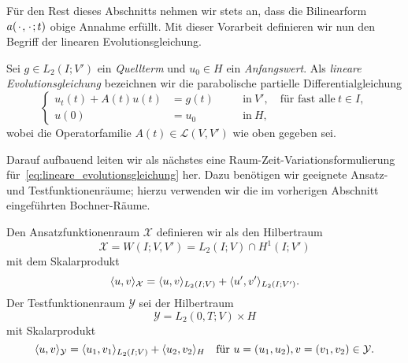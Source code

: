 Für den Rest dieses Abschnitts nehmen wir stets an, dass die Bilinearform $a({\mkern2mu\cdot\mkern2mu}, {\mkern2mu\cdot\mkern2mu}; t)$ obige Annahme erfüllt.
Mit dieser Vorarbeit definieren wir nun den Begriff der linearen Evolutionsgleichung.

\begin{Definition}
\label{definition:lineare_evolutionsgleichung}
    Sei $g \in L_{2}(I; V')$ ein \emph{Quellterm} und $u_{0} \in H$ ein \emph{Anfangswert}.
    Als \emph{lineare Evolutionsgleichung} bezeichnen wir die parabolische partielle Differentialgleichung
    \begin{equation}
        \label{eq:lineare_evolutionsgleichung}
        \left\{
        \begin{aligned}
            u_{t}(t) + A(t) u(t) &= g(t)     \quad&&\text{in}~V', \quad \text{für fast alle}~t \in I, \\
            u(0) &= u_{0}                    \quad&&\text{in}~H,
        \end{aligned}
        \right.
    \end{equation}
    wobei die  Operatorfamilie $A(t) \in \mathcal L(V, V')$ wie oben gegeben sei.
\end{Definition}

Darauf aufbauend leiten wir als nächstes eine Raum-Zeit-Variationsformulierung für~\cref{eq:lineare_evolutionsgleichung} her.
Dazu benötigen wir geeignete Ansatz- und Testfunktionenräume; hierzu verwenden wir die im vorherigen Abschnitt eingeführten Bochner-Räume.

\begin{Definition}
\label{definition:ansatz_und_testraum}
    Den Ansatzfunktionenraum $\mathcal X$ definieren wir als den Hilbertraum
    \begin{equation}
    \label{eq:ansatzraum_X}
        \mathcal X = W(I; V, V') = L_{2}(I; V) \cap H^{1}(I; V')
    \end{equation}
    mit dem Skalarprodukt
    \begin{equation}
    \label{eq:ansatzraum_skalarprodukt}
        \langle u,v\rangle_{\mathcal X} = \langle u,v\rangle_{L_{2}(I; V)} + \langle u',v'\rangle_{L_{2}(I; V')}.
    \end{equation}
    Der Testfunktionenraum $\mathcal Y$ sei der Hilbertraum
    \begin{equation}
    \label{eq:testraum_Y}
        \mathcal Y = L_{2}(0, T; V) \times H
    \end{equation}
    mit Skalarprodukt
    \begin{equation}
        \label{eq:testraum_skalarprodukt}
        \langle u,v\rangle_{\mathcal Y} = \langle u_{1},v_{1}\rangle_{L_{2}(I; V)} + \langle u_{2},v_{2}\rangle_{H} \quad \text{für } u = (u_{1}, u_{2}), v = (v_{1}, v_{2}) \in \mathcal Y.
    \end{equation}
\end{Definition}

